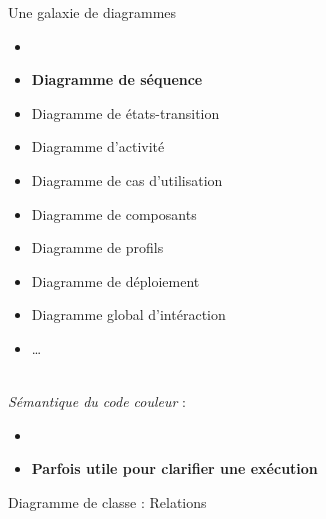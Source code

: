\begin{frame}{Une galaxie de diagrammes}

    \begin{minipage}{0.49\linewidth}  
        \begin{itemize}
            \item {}
            \item \textbf{Diagramme de séquence}
            \item Diagramme de états-transition
            \item Diagramme d'activité
            \item Diagramme de cas d'utilisation
        \end{itemize}
    \end{minipage}
    \begin{minipage}{0.49\linewidth}
        \begin{itemize}
            \item Diagramme de composants
            \item Diagramme de profils
            \item Diagramme de déploiement
            \item Diagramme global d'intéraction
            \item \dots
        \end{itemize}
    \end{minipage}\\

    \textit{Sémantique du code couleur} :
    \begin{itemize}
        \item {}
        \item \textbf{Parfois utile pour clarifier une exécution}
    \end{itemize}
\end{frame}

\begin{frame}{Diagramme de classe : Relations}


\end{frame}


